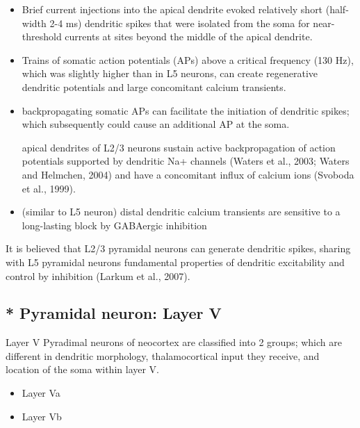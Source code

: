 \begin{itemize}
  
  \item  Brief current injections into the apical dendrite evoked relatively
  short (half-width 2-4 ms) dendritic spikes that were isolated from the soma
  for near-threshold currents at sites beyond the middle of the apical dendrite.
  
  \item Trains of somatic action potentials (APs) above a critical frequency
  (130 Hz), which was slightly higher than in L5 neurons, 
  can create regenerative dendritic potentials and large concomitant calcium
  transients.
  
  \item backpropagating  somatic APs can facilitate the initiation of dendritic
  spikes; which subsequently could cause an additional AP at the soma.
  
  apical dendrites of L2/3 neurons sustain active backpropagation of action
  potentials supported by dendritic Na+ channels (Waters et al., 2003; Waters
  and Helmchen, 2004) and have a concomitant influx of calcium ions (Svoboda et
  al., 1999).
  
  \item  (similar to L5 neuron) distal dendritic calcium transients are
  sensitive to a long-lasting block by GABAergic inhibition
\end{itemize}

It is believed that L2/3 pyramidal neurons can generate dendritic spikes,
sharing with L5 pyramidal neurons fundamental properties of dendritic
excitability and control by inhibition (Larkum et al., 2007).


\subsection{ * Pyramidal neuron: Layer V}
\label{sec:pyramidal-neuron-layer-V}

Layer V Pyradimal neurons of neocortex are classified into 2 groups; which are
different in dendritic morphology, thalamocortical input they receive, and
location of the soma within layer V.

\begin{itemize}
  \item Layer Va
  
  \item Layer Vb
\end{itemize}

